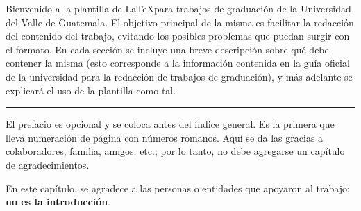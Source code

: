 Bienvenido a la plantilla de \LaTeX para trabajos de graduación de la Universidad del Valle de Guatemala. El objetivo principal de la misma es facilitar la redacción del contenido del trabajo, evitando los posibles problemas que puedan surgir con el formato. En cada sección se incluye una breve descripción sobre qué debe contener la misma (esto corresponde a la información contenida en la guía oficial de la universidad para la redacción de trabajos de graduación), y más adelante se explicará el uso de la plantilla como tal.

\noindent\rule{\linewidth}{0.4pt}

El prefacio es opcional y se coloca antes del índice general. Es la primera que lleva numeración de página con números romanos. Aquí se da las gracias a colaboradores, familia, amigos, etc.; por lo tanto, no debe agregarse un capítulo de agradecimientos. 

En este capítulo, se agradece a las personas o entidades que apoyaron al trabajo; \textbf{no es la introducción}.